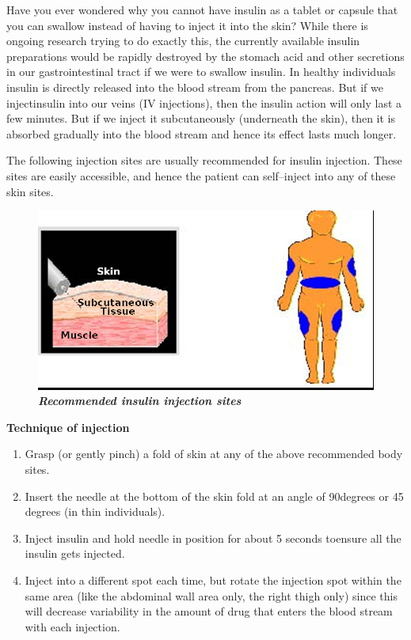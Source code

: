 Have you ever wondered why you cannot have insulin as a tablet or capsule that you can swallow instead of having to inject it into the skin? While there is ongoing research trying to do exactly this, the currently available insulin preparations would be rapidly destroyed by the stomach acid and other secretions in our gastrointestinal tract if we were to swallow insulin. In healthy individuals insulin is directly released into the blood stream from the pancreas. But if we inject\break insulin into our veins (IV injections), then the insulin action will only last a few minutes. But if we inject it subcutaneously (underneath the skin), then it is absorbed gradually into the blood stream and hence its effect lasts much longer.

The following injection sites are usually recommended for insulin injection. These sites are easily accessible, and hence the patient can self–inject into any of these skin sites.

\begin{figure}[h]
\centering
\includegraphics[scale=1.6]{images/089.jpg}\\
\textbf{\textit{Recommended insulin injection sites}}
\end{figure}

\clearpage

\noindent\textbf{Technique of injection}

\vspace{-\topsep}
\begin{enumerate}[•]
\itemsep=0pt
\item Grasp (or gently pinch) a fold of skin at any of the above reco\-mmended body sites.
\item Insert the needle at the bottom of the skin fold at an angle of 90\break degrees or 45 degrees (in thin individuals).
\item Inject insulin and hold needle in position for about 5 seconds to\break ensure all the insulin gets injected.
\item Inject into a different spot each time, but rotate the injection spot within the same area (like the abdominal wall area only, the right thigh only) since this will decrease variability in the amount of drug that enters the blood stream with each injection.
\end{enumerate}


